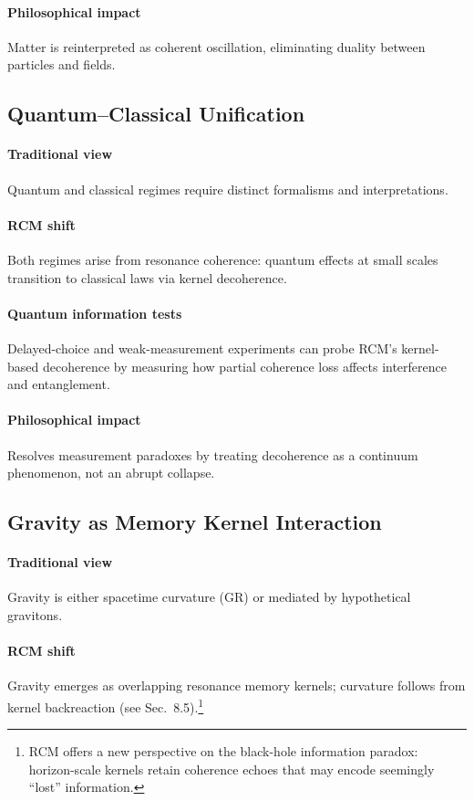 \paragraph{Philosophical impact}  
Matter is reinterpreted as coherent oscillation, eliminating duality between particles and fields.

\subsection*{Quantum–Classical Unification}

\paragraph{Traditional view}  
Quantum and classical regimes require distinct formalisms and interpretations.

\paragraph{RCM shift}  
Both regimes arise from resonance coherence: quantum effects at small scales transition to classical laws via kernel decoherence.

\paragraph{Quantum information tests}  
Delayed-choice and weak-measurement experiments can probe RCM’s kernel-based decoherence by measuring how partial coherence loss affects interference and entanglement.

\paragraph{Philosophical impact}  
Resolves measurement paradoxes by treating decoherence as a continuum phenomenon, not an abrupt collapse.

\subsection*{Gravity as Memory Kernel Interaction}

\paragraph{Traditional view}  
Gravity is either spacetime curvature (GR) or mediated by hypothetical gravitons.

\paragraph{RCM shift}  
Gravity emerges as overlapping resonance memory kernels; curvature follows from kernel backreaction (see Sec.~8.5).\footnote{RCM offers a new perspective on the black-hole information paradox: horizon-scale kernels retain coherence echoes that may encode seemingly “lost” information.}

